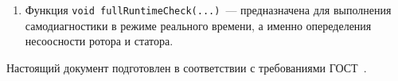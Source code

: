 \begin{enumerate}
\begin{enumerate}
        \item Функция \verb|void fullRuntimeCheck(...)|~--- предназначена для выполнения самодиагностики в режиме реального времени, а именно опеределения несоосности ротора и статора.
    \end{enumerate}
\end{enumerate}


Настоящий документ подготовлен в соответствии с требованиями ГОСТ~\cite{gost19106}.
